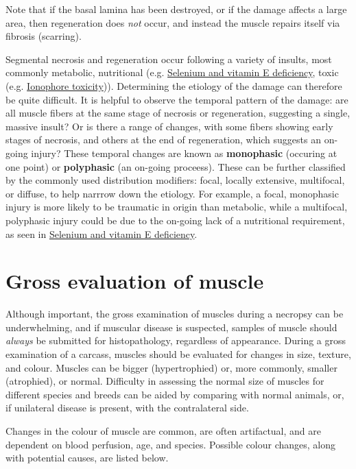 \documentclass[openany]{book}
\begin{document}
Note that if the basal lamina has been destroyed, or if the damage
affects a large area, then regeneration does \emph{not} occur, and
instead the muscle repairs itself via fibrosis (scarring).

Segmental necrosis and regeneration occur following a variety of
insults, most commonly metabolic, nutritional (e.g.
\protect\hyperlink{selenium-and-vitamin-e-deficiency}{Selenium and
vitamin E deficiency}, toxic (e.g.
\protect\hyperlink{ionophore-toxicity}{Ionophore toxicity})).
Determining the etiology of the damage can therefore be quite difficult.
It is helpful to observe the temporal pattern of the damage: are all
muscle fibers at the same stage of necrosis or regeneration, suggesting
a single, massive insult? Or is there a range of changes, with some
fibers showing early stages of necrosis, and others at the end of
regeneration, which suggests an on-going injury? These temporal changes
are known as \textbf{monophasic} (occuring at one point) or
\textbf{polyphasic} (an on-going proceess). These can be further
classified by the commonly used distribution modifiers: focal, locally
extensive, multifocal, or diffuse, to help narrrow down the etiology.
For example, a focal, monophasic injury is more likely to be traumatic
in origin than metabolic, while a multifocal, polyphasic injury could be
due to the on-going lack of a nutritional requirement, as seen in
\protect\hyperlink{selenium-and-vitamin-e-deficiency}{Selenium and
vitamin E deficiency}.

\section{Gross evaluation of muscle}\label{gross-evaluation-of-muscle}

Although important, the gross examination of muscles during a necropsy
can be underwhelming, and if muscular disease is suspected, samples of
muscle should \emph{always} be submitted for histopathology, regardless
of appearance. During a gross examination of a carcass, muscles should
be evaluated for changes in size, texture, and colour. Muscles can be
bigger (hypertrophied) or, more commonly, smaller (atrophied), or
normal. Difficulty in assessing the normal size of muscles for different
species and breeds can be aided by comparing with normal animals, or, if
unilateral disease is present, with the contralateral side.

Changes in the colour of muscle are common, are often artifactual, and
are dependent on blood perfusion, age, and species. Possible colour
changes, along with potential causes, are listed below.
\end{document}
